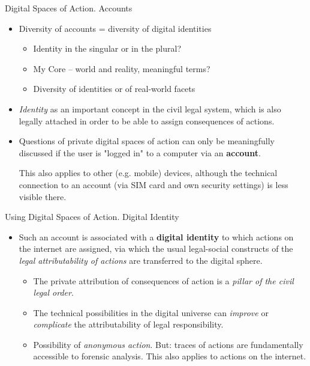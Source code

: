 \documentclass{beamer}
\begin{document}
\begin{frame}{Digital Spaces of Action. Accounts}
  \begin{itemize}
  \item Diversity of accounts = diversity of digital identities
    \begin{itemize}
    \item Identity in the singular or in the plural?
    \item My Core -- world and reality, meaningful terms?
    \item Diversity of identities or of real-world facets
    \end{itemize}
  \item \emph{Identity} as an important concept in the civil legal system,
    which is also legally attached in order to be able to assign consequences
    of actions.
\item Questions of private digital spaces of action can only be meaningfully
  discussed if the user is "logged in" to a computer via an \textbf{account}.

  This also applies to other (e.g. mobile) devices, although the technical
  connection to an account (via SIM card and own security settings) is less
  visible there.
  \end{itemize}
\end{frame}
\begin{frame}{Using Digital Spaces of Action. Digital Identity}  
\begin{itemize}
\item Such an account is associated with a \textbf{digital identity} to which
  actions on the internet are assigned, via which the usual legal-social
  constructs of the \emph{legal attributability of actions} are transferred to
  the digital sphere.  
  \begin{itemize}
  \item The private attribution of consequences of action is a \emph{pillar of
    the civil legal order}.
  \item The technical possibilities in the digital universe can \emph{improve}
    or \emph{complicate} the attributability of legal responsibility.
  \item Possibility of \emph{anonymous action}. But: traces of actions are
    fundamentally accessible to forensic analysis. This also applies to
    actions on the internet.
  \end{itemize}
\end{itemize}
\end{frame}
\end{document}
